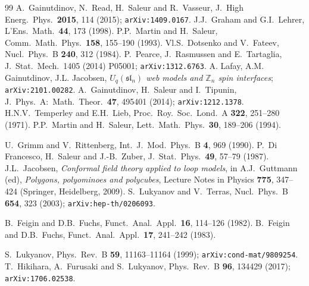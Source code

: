 \documentclass[a4paper,10pt]{article}
\begin{document}
\begin{thebibliography}{99}
 A.\ Gainutdinov, N.\ Read, H.\ Saleur and R.\ Vasseur, %
J.\ High Energ.\ Phys.\ {\bf 2015}, 114 (2015); {\tt arXiv:1409.0167}.
 J.J.\ Graham and G.I.\ Lehrer, %
L'Ens.\ Math.\ {\bf 44}, 173 (1998).
 P.P.\ Martin and H.\ Saleur, %
Comm.\ Math.\ Phys.\ {\bf 158}, 155--190 (1993).
 Vl.S.\ Dotsenko and V.\ Fateev, Nucl.\ Phys.\ B {\bf 240}, 312 (1984).
 P.\ Pearce, J.\ Rasmussen and E.\ Tartaglia, J.\ Stat.\ Mech.\ 1405 (2014) P05001; {\tt arXiv:1312.6763}.
 A. Lafay, A.M. Gainutdinov, J.L. Jacobsen, {\em  $U_q(\mathfrak{sl}_n)$ web models and $\mathbb{Z}_n$ spin interfaces};  {\tt arXiv:2101.00282}.
 A.\ Gainutdinov, H.\ Saleur and I.\ Tipunin, J.\ Phys.\ A:\ Math.\ Theor.\ {\bf 47}, 495401 (2014); {\tt arXiv:1212.1378}.
 H.N.V.\ Temperley and E.H.\ Lieb, Proc.\ Roy.\ Soc.\ Lond.\ A {\bf 322}, 251--280 (1971).
 P.P.\ Martin and H.\ Saleur, %
  Lett.\ Math.\ Phys.\ {\bf 30}, 189--206 (1994).


 U.\ Grimm and V.\ Rittenberg, Int.\ J.\ Mod.\ Phys.\ B {\bf 4}, 969 (1990).
 P.\ Di Francesco, H.\ Saleur and J.-B.\ Zuber, J.\ Stat.\ Phys.\ {\bf 49}, 57--79 (1987).
 J.L.\ Jacobsen, {\em Conformal field theory applied to loop models}, in A.J.\ Guttmann (ed), {\em Polygons, polyominoes and polycubes}, Lecture Notes in Physics {\bf 775}, 347--424 (Springer, Heidelberg, 2009).
 S.\ Lukyanov and V.\ Terras, Nucl.\ Phys.\ B {\bf 654}, 323 (2003); {\tt arXiv:hep-th/0206093}.


 B.\ Feigin and D.B.\ Fuchs, Funct.\ Anal.\ Appl.\ {\bf 16}, 114--126 (1982).
 B.\ Feigin and D.B.\ Fuchs, Funct.\ Anal.\ Appl.\ {\bf 17}, 241--242 (1983). 


 S.\ Lukyanov, Phys.\ Rev.\ B {\bf 59}, 11163--11164 (1999); {\tt arXiv:cond-mat/9809254}.
 T.\ Hikihara, A.\ Furusaki and S.\ Lukyanov, Phys.\ Rev.\ B {\bf 96}, 134429 (2017); {\tt arXiv:1706.02538}.



\end{thebibliography}
\end{document}
